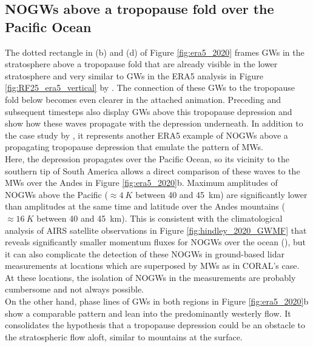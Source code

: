 \subsection*{NOGWs above a tropopause fold over the Pacific Ocean}
The dotted rectangle in (b) and (d) of Figure \ref{fig:era5_2020} frames GWs in the stratosphere above a tropopause fold that are already visible in the lower stratosphere and very similar to GWs in the ERA5 analysis in Figure \ref{fig:RF25_era5_vertical} by \textcite{dornbrack_stratospheric_2022}. The connection of these GWs to the tropopause fold below becomes even clearer in the attached animation. Preceding and subsequent timesteps also display GWs above this tropopause depression and show how these waves propagate with the depression underneath. In addition to the case study by \textcite{dornbrack_stratospheric_2022}, it represents another ERA5 example of NOGWs above a propagating tropopause depression that emulate the pattern of MWs. \\
Here, the depression propagates over the Pacific Ocean, so its vicinity to the southern tip of South America allows a direct comparison of these waves to the MWs over the Andes in Figure \ref{fig:era5_2020}b. Maximum amplitudes of NOGWs above the Pacific ($\approx \SI{4}{K}$ between 40 and \SI{45}{\kilo\meter}) are significantly lower than amplitudes at the same time and latitude over the Andes mountains ($\approx \SI{16}{K}$ between 40 and \SI{45}{\kilo\meter}). This is consistent with the climatological analysis of AIRS satellite observations in Figure \ref{fig:hindley_2020_GWMF} that reveals significantly smaller momentum fluxes for NOGWs over the ocean (\cite[]{hindley_18year_2020}), but it can also complicate the detection of these NOGWs in ground-based lidar measurements at locations which are superposed by MWs as in CORAL's case. At these locations, the isolation of NOGWs in the measurements are probably cumbersome and not always possible. \\
On the other hand, phase lines of GWs in both regions in Figure \ref{fig:era5_2020}b show a comparable pattern and lean into the predominantly westerly flow. It consolidates the hypothesis that a tropopause depression could be an obstacle to the stratospheric flow aloft, similar to mountains at the surface. 

